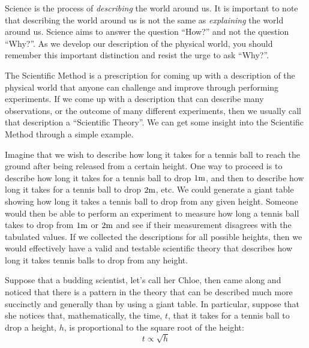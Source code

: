 \documentclass[9pt,Preprint]{lapreprint}
\begin{document}
Science is the process of \textit{describing} the world around us. It is important to note that describing the world around us is not the same as \textit{explaining} the world around us. Science aims to answer the question ``How?'' and not the question ``Why?''. As we develop our description of the physical world, you should remember this important distinction and resist the urge to ask ``Why?''.

The Scientific Method is a prescription for coming up with a description of the physical world that anyone can challenge and improve through performing experiments. If we come up with a description that can describe many observations, or the outcome of many different experiments, then we usually call that description a ``Scientific Theory''. We can get some insight into the Scientific Method through a simple example.

Imagine that we wish to describe how long it takes for a tennis ball to reach the ground after being released from a certain height. One way to proceed is to describe how long it takes for a tennis ball to drop $1 {\rm m}$, and then to describe how long it takes for a tennis ball to drop $2 {\rm m}$, etc. We could generate a giant table showing how long it takes a tennis ball to drop from any given height. Someone would then be able to perform an experiment to measure how long a tennis ball takes to drop from $1 {\rm m}$ or $2 {\rm m}$ and see if their measurement disagrees with the tabulated values. If we collected the descriptions for all possible heights, then we would effectively have a valid and testable scientific theory that describes how long it takes tennis balls to drop from any height.

Suppose that a budding scientist, let's call her Chloe, then came along and noticed that there is a pattern in the theory that can be described much more succinctly and generally than by using a giant table. In particular, suppose that she notices that, mathematically, the time, $t$, that it takes for a tennis ball to drop a height, $h$, is proportional to the square root of the height:
\begin{equation}
t \propto \sqrt{h}
\end{equation}
\end{document}
